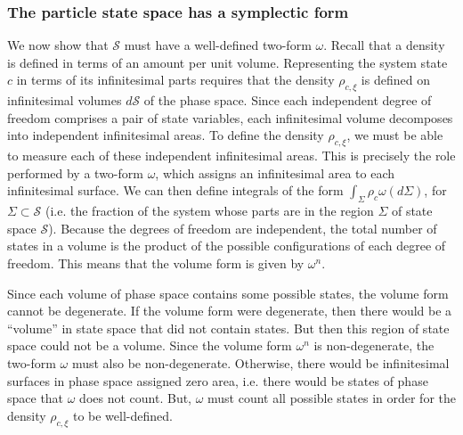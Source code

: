 \documentclass[12pt, twoside]{article}
\begin{document}
\subsubsection{The particle state space has a symplectic form}

We now show that $\mathcal{S}$ must have a well-defined two-form $\omega$. Recall that a density is defined in terms of an amount per unit volume. Representing the system state $c$ in terms of its infinitesimal parts requires that the density $\rho_{c, \xi} $ is defined on infinitesimal volumes $d \mathcal{S}$ of the phase space. Since each independent degree of freedom comprises a pair of state variables, each infinitesimal volume decomposes into independent infinitesimal areas. To define the density $\rho_{c, \xi} $, we must be able to measure each of these independent infinitesimal areas. This is precisely the role performed by a two-form $\omega$, which assigns an infinitesimal area to each infinitesimal surface. We can then define integrals of the form $\int_{\Sigma} \rho_c \omega(d\Sigma)$, for $\Sigma \subset \mathcal{S}$ (i.e. the fraction of the system whose parts are in the region $\Sigma$ of state space $\mathcal{S}$). Because the degrees of freedom are independent, the total number of states in a volume is the product of the possible configurations of each degree of freedom. This means that the volume form is given by $\omega^n$. 

Since each volume of phase space contains some possible states, the volume form cannot be degenerate. If the volume form were degenerate, then there would be a ``volume'' in state space that did not contain states. But then this region of state space could not be a volume. Since the volume form $\omega^n$ is non-degenerate, the two-form $\omega$ must also be non-degenerate. Otherwise, there would be infinitesimal surfaces in phase space assigned zero area, i.e. there would be states of phase space that $\omega$ does not count. But, $\omega$ must count all possible states in order for the density $\rho_{c, \xi} $ to be well-defined.


\end{document}
